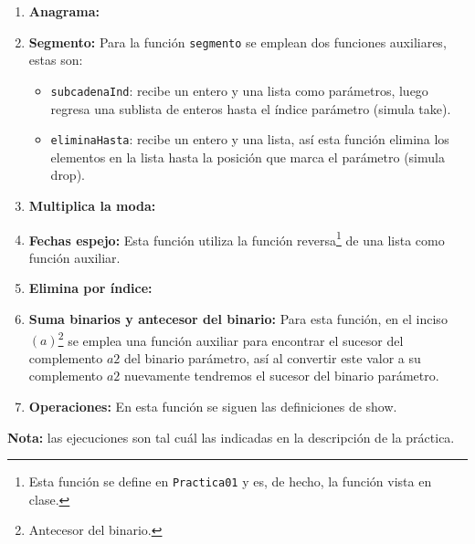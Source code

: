 \documentclass{article}
\newcommand{\code}[1]{\textcolor{white!25!black}{\texttt{#1}}}
\begin{document}
\begin{enumerate}
  
\item \textbf{Anagrama:}
  
\item \textbf{Segmento:} Para la función \code{segmento} se emplean dos funciones
  auxiliares, estas son:
  \begin{itemize}
  \item \code{subcadenaInd}: recibe un entero y una lista como parámetros, luego
    regresa una sublista de enteros hasta el índice parámetro (simula take).
  \item \code{eliminaHasta}: recibe un entero y una lista, así esta función elimina
    los elementos en la lista hasta la posición que marca el parámetro (simula drop).
  \end{itemize}
\item \textbf{Multiplica la moda:}
  
\item \textbf{Fechas espejo:} Esta función utiliza la función reversa\footnote{Esta
función se define en \code{Practica01} y es, de hecho, la función vista en clase.}
  de una lista como función auxiliar.
  
\item \textbf{Elimina por índice:}
  
\item \textbf{Suma binarios y antecesor del binario:} Para esta función, en el
  inciso $(a)$\footnote{Antecesor del binario.} se emplea una función auxiliar
  para encontrar el sucesor del complemento $a2$ del binario parámetro, así al
  convertir este valor a su complemento $a2$ nuevamente tendremos el sucesor
  del binario parámetro.
  
\item \textbf{Operaciones:} En esta función se siguen las definiciones de show.
\end{enumerate}
\textbf{Nota:} las ejecuciones son tal cuál las indicadas en la descripción de la práctica.

\begin{center}
\end{center}
\end{document}
